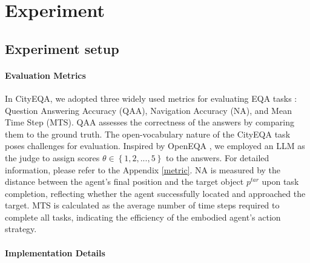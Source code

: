 \section{Experiment}
\label{expriment}





\subsection{Experiment setup}

\paragraph{Evaluation Metrics}
In CityEQA, we adopted three widely used metrics for evaluating EQA tasks \cite{das2018embodied}: Question Answering Accuracy (QAA), Navigation Accuracy (NA), and Mean Time Step (MTS). QAA assesses the correctness of the answers by comparing them to the ground truth. The open-vocabulary nature of the CityEQA task poses challenges for evaluation. Inspired by OpenEQA \cite{majumdar2024openeqa}, we employed an LLM as the judge to assign scores $\theta  \in \left\{ {1,2,...,5} \right\}$ to the answers. For detailed information, please refer to the Appendix \ref{metric}. NA is measured by the distance between the agent's final position and the target object ${p^{tar}}$ upon task completion, reflecting whether the agent successfully located and approached the target. MTS is calculated as the average number of time steps required to complete all tasks, indicating the efficiency of the embodied agent's action strategy.

\paragraph{Implementation Details}

